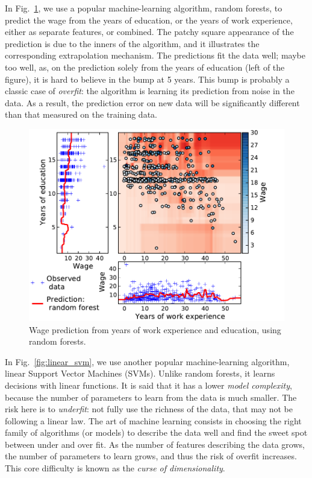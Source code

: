 \documentclass[a4paper]{article}
\begin{document}
In Fig.~\ref{fig:random_forest}, we use a popular machine-learning
algorithm, random forests, to predict the wage from the years of
education, or the years of work experience, either as separate features,
or combined. The patchy square appearance of the prediction is due to the
inners of the algorithm, and it illustrates the corresponding
extrapolation mechanism. The predictions fit the data well; maybe too
well, as, on the prediction solely from the years of education (left of
the figure), it is hard to believe in the bump at 5 years. This bump is
probably a classic case of \emph{overfit}: the algorithm is learning its
prediction from noise in the data. As a result, the prediction error on
new data will be significantly different than that measured on the
training data.

\begin{figure}[b]
    \includegraphics[width=1.05\linewidth]{wage_data_random_forest}%

    \caption{Wage prediction from years of work experience and education,
    using random forests.\label{fig:random_forest}}
\end{figure}


In Fig.~\ref{fig:linear_svm}, we use another popular machine-learning
algorithm, linear Support Vector Machines (SVMs). Unlike random forests,
it learns decisions with linear functions. It is said that
it has a lower \emph{model complexity}, because the number of parameters
to learn from the data is much smaller. The risk here is to
\emph{underfit}: not fully use the richness of the data, that may not be
following a linear law. The art of machine learning consists in choosing
the right family of algorithms (or models) to describe the data well and
find the sweet spot between under and over fit. As the number of features
describing the data grows, the number of parameters to learn grows, and
thus the risk of overfit increases. This core difficulty is known as the
\emph{curse of dimensionality}.
\end{document}
